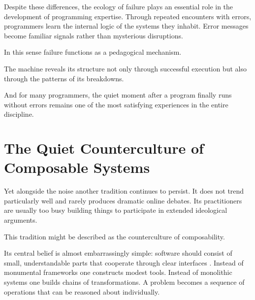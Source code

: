 \documentclass[11pt]{article}
\theoremstyle{definition}
\begin{document}
Despite these differences, the ecology of failure plays an essential
role in the development of programming expertise. Through repeated
encounters with errors, programmers learn the internal logic of the
systems they inhabit. Error messages become familiar signals rather
than mysterious disruptions.

In this sense failure functions as a pedagogical mechanism.

The machine reveals its structure not only through successful
execution but also through the patterns of its breakdowns.

And for many programmers, the quiet moment after a program finally
runs without errors remains one of the most satisfying experiences in
the entire discipline.

\section{The Quiet Counterculture of Composable Systems}

Yet alongside the noise another tradition continues to persist. It does
not trend particularly well and rarely produces dramatic online debates.
Its practitioners are usually too busy building things to participate in
extended ideological arguments.

This tradition might be described as the counterculture of composability.

Its central belief is almost embarrassingly simple: software should
consist of small, understandable parts that cooperate through clear
interfaces \cite{mcilroy1978,raymond2003}. Instead of monumental
frameworks one constructs modest tools. Instead of monolithic systems
one builds chains of transformations. A problem becomes a sequence of
operations that can be reasoned about individually.
\end{document}
